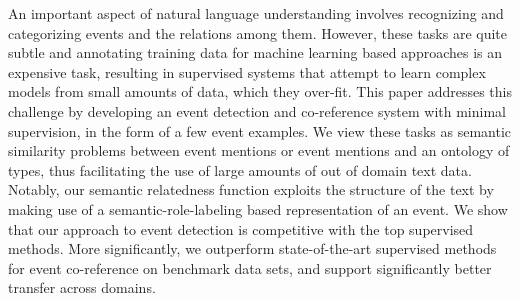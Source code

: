 An important aspect of natural language understanding involves recognizing and categorizing events and the relations among them. However, these tasks are quite subtle and annotating training data for machine learning based approaches is an expensive task, resulting in supervised systems that attempt to learn complex models from small amounts of data, which they over-fit. This paper addresses this challenge by developing an event detection and co-reference system with minimal supervision, in the form of a few event examples. We view these tasks as semantic similarity problems between event mentions or event mentions and an ontology of types, thus facilitating the use of large amounts of out of domain text data. Notably, our semantic relatedness function exploits the structure of the text by making use of a semantic-role-labeling based representation of an event. We show that our approach to event detection is competitive with the top supervised methods. More significantly, we outperform state-of-the-art supervised methods for event co-reference on benchmark data sets, and support significantly better transfer across domains.
